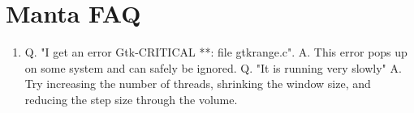 








\section{Manta FAQ}

\begin{enumerate}
\item
Q. "I get an error Gtk-CRITICAL **: file gtkrange.c".
A.  This error pops up on some system and can safely be ignored.
Q.  "It is running very slowly"
A.  Try increasing the number of threads, shrinking the window size, and reducing the step size through the volume.
\end{enumerate}


